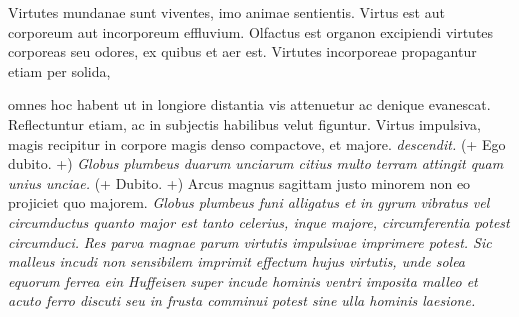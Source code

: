 \pstart 
{}  Virtutes mundanae sunt viventes,  imo animae sentientis. Virtus est aut corporeum  aut incorporeum effluvium. Olfactus est organon excipiendi virtutes corporeas seu odores, ex quibus et aer est. Virtutes incorporeae propagantur etiam per solida,\rule[-1.5cm]{0cm}{0cm}  omnes hoc habent ut in longiore distantia vis  attenuetur ac denique evanescat. Reflectuntur  etiam, ac in subjectis habilibus velut figuntur.
\pend 
\pstart 
{} Virtus impulsiva, magis recipitur in corpore magis denso compactove, et majore. \textit{ descendit.}  (+ Ego dubito. +) \textit{Globus plumbeus duarum unciarum  citius multo terram attingit quam unius unciae.}  (+ Dubito. +) Arcus magnus sagittam justo minorem  non eo projiciet quo majorem. \textit{Globus plumbeus  funi alligatus et in gyrum vibratus vel  circumductus quanto major est tanto celerius, inque  majore, circumferentia potest circumduci.} \textit{Res  parva magnae parum virtutis impulsivae imprimere  potest. Sic malleus incudi non sensibilem imprimit  effectum hujus virtutis, unde solea equorum  ferrea ein Huffeisen super incude hominis  ventri imposita malleo et acuto ferro discuti  seu in frusta comminui potest sine ulla hominis laesione.}
\pend 
\pstart 
